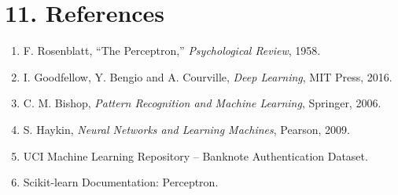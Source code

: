 \documentclass[11pt]{article}
\begin{document}

\section*{11. References}

\begin{enumerate}
\item F. Rosenblatt, ``The Perceptron,'' \emph{Psychological Review}, 1958.
\item I. Goodfellow, Y. Bengio and A. Courville, \emph{Deep Learning}, MIT Press, 2016.
\item C. M. Bishop, \emph{Pattern Recognition and Machine Learning}, Springer, 2006.
\item S. Haykin, \emph{Neural Networks and Learning Machines}, Pearson, 2009.
\item UCI Machine Learning Repository -- Banknote Authentication Dataset.
\item Scikit-learn Documentation: Perceptron.
\end{enumerate}
\end{document}
